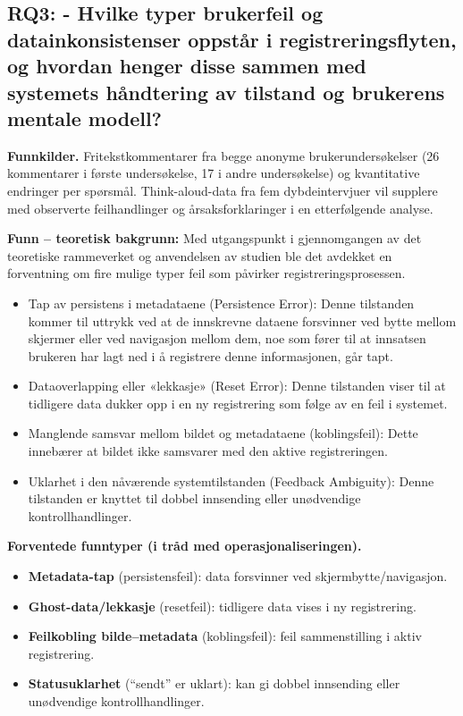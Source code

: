 \subsection{RQ3: - Hvilke typer brukerfeil og datainkonsistenser oppstår i registreringsflyten, og hvordan henger disse sammen med systemets håndtering av tilstand og brukerens mentale modell?}

\textbf{Funnkilder.} Fritekstkommentarer fra begge anonyme brukerundersøkelser (26 kommentarer i første undersøkelse, 17 i andre undersøkelse) og kvantitative endringer per spørsmål. Think-aloud-data fra fem dybdeintervjuer vil supplere med observerte feilhandlinger og årsaksforklaringer i en etterfølgende analyse.

\textbf{Funn – teoretisk bakgrunn: } Med utgangspunkt i gjennomgangen av det teoretiske rammeverket og anvendelsen av studien ble det avdekket en forventning om fire mulige typer feil som påvirker registreringsprosessen.
\begin{itemize}
    \item Tap av persistens i metadataene (Persistence Error): Denne tilstanden kommer til uttrykk ved at de innskrevne dataene forsvinner ved bytte mellom skjermer eller ved navigasjon mellom dem, noe som fører til at innsatsen brukeren har lagt ned i å registrere denne informasjonen, går tapt.

    \item Dataoverlapping eller «lekkasje» (Reset Error): Denne tilstanden viser til at tidligere data dukker opp i en ny registrering som følge av en feil i systemet.

    \item Manglende samsvar mellom bildet og metadataene (koblingsfeil): Dette innebærer at bildet ikke samsvarer med den aktive registreringen.

    \item Uklarhet i den nåværende systemtilstanden (Feedback Ambiguity): Denne tilstanden er knyttet til dobbel innsending eller unødvendige kontrollhandlinger.
\end{itemize}


\textbf{Forventede funntyper (i tråd med operasjonaliseringen).}
\begin{itemize}
  \item \textbf{Metadata-tap} (persistensfeil): data forsvinner ved skjermbytte/navigasjon.
  \item \textbf{Ghost-data/lekkasje} (resetfeil): tidligere data vises i ny registrering.
  \item \textbf{Feilkobling bilde--metadata} (koblingsfeil): feil sammenstilling i aktiv registrering.
  \item \textbf{Statusuklarhet} (``sendt'' er uklart): kan gi dobbel innsending eller unødvendige kontrollhandlinger.
\end{itemize}

